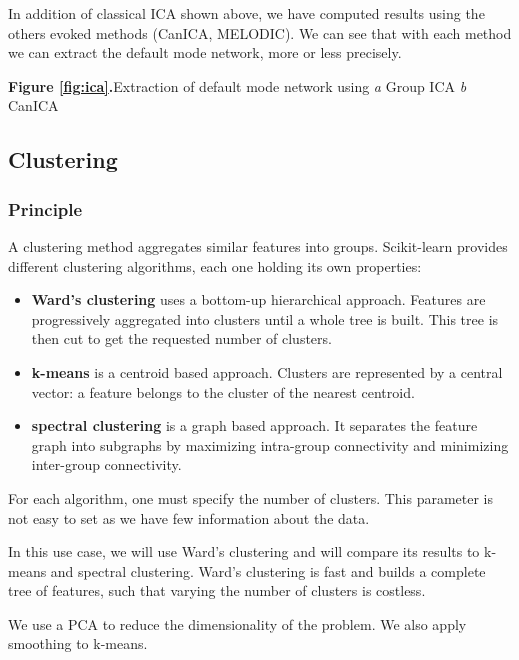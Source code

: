 \documentclass{frontiersSCNS} %
\newcommand{\alex}[1]{\todo[inline, color=green!40]{#1}}
\begin{document}
In addition of classical ICA shown above, we have computed results using the
others evoked methods (CanICA, MELODIC). We can see that with each method we can
extract the default mode network, more or less precisely.

\textbf{Figure \ref{fig:ica}.}{Extraction of default mode network using \textit{a} Group ICA
  \textit{b} CanICA}\label{fig:03}

\alex{MELODIC is missing}

\subsection{Clustering}

\subsubsection{Principle}

A clustering method aggregates similar features into groups. Scikit-learn
provides different clustering algorithms, each one holding its own properties:

\begin{itemize}
    \item{\bf Ward's clustering} uses a bottom-up hierarchical approach. Features are
        progressively aggregated into clusters until a whole tree is built. This
        tree is then cut to get the requested number of clusters.
    \item{\bf k-means} is a centroid based approach. Clusters are represented by
        a central vector: a feature belongs to the cluster of the nearest
        centroid.
    \item{\bf spectral clustering} is a graph based approach. It separates
        the feature graph into subgraphs by maximizing intra-group connectivity and
        minimizing inter-group connectivity.
\end{itemize}

For each algorithm, one must specify the number of clusters. This parameter is
not easy to set as we have few information about the data.

In this use case, we will use Ward's clustering and will compare its results to
k-means and spectral clustering. Ward's clustering is fast and builds a complete
tree of features, such that varying the number of clusters is costless.

We use a PCA to reduce the dimensionality of the problem. We also apply
smoothing to k-means.
\end{document}
